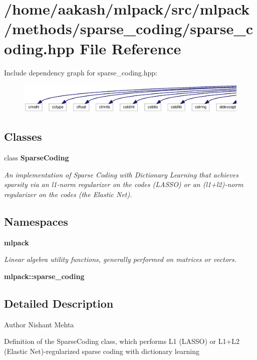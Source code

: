 \section{/home/aakash/mlpack/src/mlpack/methods/sparse\+\_\+coding/sparse\+\_\+coding.hpp File Reference}
\label{sparse__coding_8hpp}
Include dependency graph for sparse\+\_\+coding.\+hpp\+:
\nopagebreak
\begin{figure}[H]
\begin{center}
\leavevmode
\includegraphics[width=350pt]{sparse__coding_8hpp__incl}
\end{center}
\end{figure}
\subsection*{Classes}
\begin{DoxyCompactItemize}
\item 
class \textbf{ Sparse\+Coding}
\begin{DoxyCompactList}\small\item\em An implementation of Sparse Coding with Dictionary Learning that achieves sparsity via an l1-\/norm regularizer on the codes (L\+A\+S\+SO) or an (l1+l2)-\/norm regularizer on the codes (the Elastic Net). \end{DoxyCompactList}\end{DoxyCompactItemize}
\subsection*{Namespaces}
\begin{DoxyCompactItemize}
\item 
 \textbf{ mlpack}
\begin{DoxyCompactList}\small\item\em Linear algebra utility functions, generally performed on matrices or vectors. \end{DoxyCompactList}\item 
 \textbf{ mlpack\+::sparse\+\_\+coding}
\end{DoxyCompactItemize}


\subsection{Detailed Description}
\begin{DoxyAuthor}{Author}
Nishant Mehta
\end{DoxyAuthor}
Definition of the Sparse\+Coding class, which performs L1 (L\+A\+S\+SO) or L1+\+L2 (Elastic Net)-\/regularized sparse coding with dictionary learning

